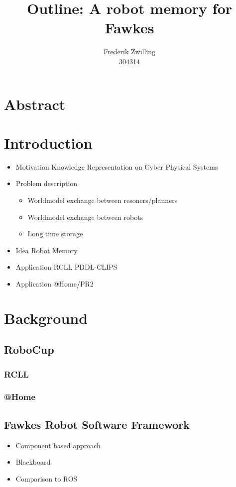 \documentclass[a4paper,11pt]{article}
\author{Frederik Zwilling\\304314}
\title{Outline: A robot memory for Fawkes}
\begin{document}
\maketitle
\tableofcontents
\newpage



\section{Abstract}

\section{Introduction}
\begin{itemize}
\item Motivation Knowledge Representation on Cyber Physical Systems
\item Problem description
  \begin{itemize}
  \item Worldmodel exchange between resoners/planners
  \item Worldmodel exchange between robots
  \item Long time storage
  \end{itemize}
\item Idea Robot Memory
\item Application RCLL PDDL-CLIPS
\item Application @Home/PR2
\end{itemize}

\section{Background}
\subsection{RoboCup}
\subsubsection{RCLL}
\subsubsection{@Home}
\subsection{Fawkes Robot Software Framework}
\begin{itemize}
\item Component based approach
\item Blackboard
\item Comparison to ROS
\end{itemize}
\end{document}
